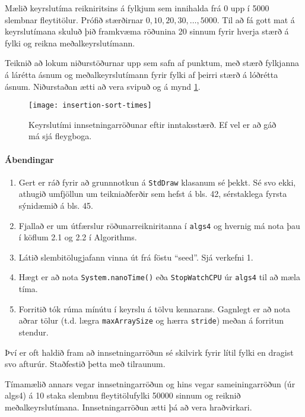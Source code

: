 \documentclass{article}
\begin{document}
Mælið keyrslutíma reikniritsins á fylkjum sem innihalda frá 0 upp í 5000 slembnar fleytitölur. Prófið stærðirnar $0, 10, 20, 30, \ldots , 5000$. Til að fá gott mat á keyrslutímana skuluð þið framkvæma röðunina 20 sinnum fyrir hverja stærð á fylki og reikna meðalkeyrslutímann.

Teiknið að lokum niðurstöðurnar upp sem safn af punktum, með stærð fylkjanna á lárétta ásnum og meðalkeyrslutímann fyrir fylki af þeirri stærð á lóðrétta ásnum. Niðurstaðan ætti að vera svipuð og á mynd \ref{mynd:1}.

\begin{figure}[h]
	\caption{Keyrslutími innsetningarröðunar eftir inntaksstærð. Ef vel er að gáð má sjá fleygboga.}
	\label{mynd:1}
	\begin{center}
		\texttt{[image: insertion-sort-times]}
	\end{center}
\end{figure}

\paragraph{Ábendingar}

\begin{enumerate}
	\item Gert er ráð fyrir að grunnnotkun á \texttt{StdDraw} klasanum sé þekkt. Sé svo ekki, athugið umfjöllun um teikniaðferðir sem hefst á bls. 42, sérstaklega fyrsta sýnidæmið á bls. 45.
    \item Fjallað er um útfærslur röðunarreikniritanna í \texttt{algs4} og hvernig má nota þau í köflum 2.1 og 2.2 í Algorithms.
    \item Látið slembitölugjafann vinna út frá föstu ``seed''. Sjá verkefni 1.
	\item Hægt er að nota \texttt{System.nanoTime()} eða \texttt{StopWatchCPU} úr \texttt{algs4} til að mæla tíma.
	\item Forritið tók rúma mínútu í keyrslu á tölvu kennarans. Gagnlegt er að nota aðrar tölur (t.d. lægra \texttt{maxArraySize} og hærra \texttt{stride}) meðan á forritun stendur.
\end{enumerate}

\question

Því er oft haldið fram að innsetningarröðun sé skilvirk fyrir lítil fylki en dragist svo afturúr. Staðfestið þetta með tilraunum.

Tímamælið annars vegar innsetningarröðun og hins vegar sameiningarröðun (úr algs4) á 10 staka slembnu fleytitölufylki 50000 sinnum og reiknið meðalkeyrslutímana. Innsetningarröðun ætti þá að vera hraðvirkari.
\end{document}
